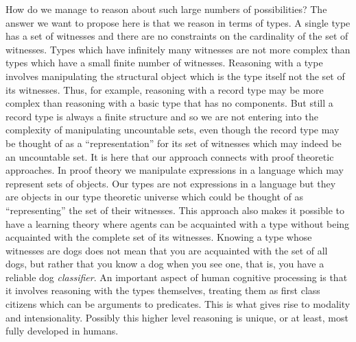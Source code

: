 How do we manage to reason about such large numbers of possibilities?
The answer we want to propose here is that we reason in terms of
types.  A single type has a set of witnesses and there are no
constraints on the cardinality of the set of witnesses.  Types which
have infinitely many witnesses are not more complex than types which
have a small finite number of witnesses.  Reasoning with a type
involves manipulating the structural object which is the type itself
not the set of its witnesses.  Thus, for example, reasoning with a
record type may be more complex than reasoning with a basic type that
has no components.  But still a record type is always a finite
structure and so we are not entering into the complexity of
manipulating uncountable sets, even though the record type may be
thought of as a ``representation'' for its set of witnesses which may
indeed be an uncountable set.  It is here that our approach connects
with proof theoretic approaches.  In proof theory we manipulate
expressions in a language which may represent sets of objects.  Our
types are not expressions in a language but they are objects in our
type theoretic universe which could be thought of as ``representing''
the set of their witnesses.  This approach also makes it possible to have a
learning theory where agents can be acquainted with a type without
being acquainted with the complete set of its witnesses.  Knowing a
type whose witnesses are dogs does not mean that you are acquainted
with the set of all dogs, but rather that you know a dog when you see
one, that is, you have a reliable dog \textit{classifier}.  An important aspect of human cognitive processing is
that it involves reasoning with the types themselves, treating them as
first class citizens which can be arguments to predicates.  This is
what gives rise to modality and intensionality.  Possibly this higher
level reasoning is unique, or at least, most fully developed in
humans.

